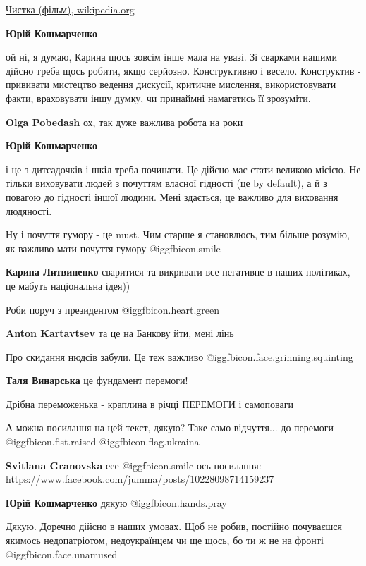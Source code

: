 \begin{itemize}
\begin{itemize}
\href{https://uk.wikipedia.org/wiki/%D0%A7%D0%B8%D1%81%D1%82%D0%BA%D0%B0_(%D1%84%D1%96%D0%BB%D1%8C%D0%BC)}{%
Чистка (фільм), wikipedia.org%
}

\textbf{Юрій Кошмарченко} 

ой ні, я думаю, Карина щось зовсім інше мала на увазі. Зі сварками нашими
дійсно треба щось робити, якщо серйозно. Конструктивно і весело. Конструктив -
прививати мистецтво ведення дискусії, критичне мислення, використовувати факти,
враховувати іншу думку, чи принаймні намагатись її зрозуміти.

\textbf{Olga Pobedash} ох, так
дуже важлива робота на роки

\textbf{Юрій Кошмарченко} 

і це з дитсадочків і шкіл треба починати. Це дійсно має стати великою місією.
Не тільки виховувати людей з почуттям власної гідності (це by default), а й з
повагою до гідності іншої людини. Мені здається, це важливо для виховання
людяності.

Ну і почуття гумору - це must. Чим старше я становлюсь, тим більше розумію, як
важливо мати почуття гумору  @igg{fbicon.smile} 

\textbf{Карина Литвиненко} сваритися та викривати все негативне в наших політиках, це мабуть національна ідея))

\end{itemize} %

Роби поруч з президентом  @igg{fbicon.heart.green} 

\textbf{Anton Kartavtsev} та це на Банкову йти, мені лінь

Про скидання нюдсів забули. Це теж важливо  @igg{fbicon.face.grinning.squinting} 

\textbf{Таля Винарська} це фундамент перемоги!

Дрібна переможенька - краплина в річці ПЕРЕМОГИ і самоповаги


А можна посилання на цей текст, дякую? Таке само відчуття... до перемоги
@igg{fbicon.fist.raised} @igg{fbicon.flag.ukraina}

\begin{itemize} %
\textbf{Svitlana Granovska} еее  @igg{fbicon.smile} 
ось посилання:
\url{https://www.facebook.com/jumma/posts/10228098714159237}

\textbf{Юрій Кошмарченко} дякую @igg{fbicon.hands.pray}
\end{itemize} %


Дякую. Доречно дійсно в наших умовах. Щоб не робив, постійно почуваєшся якимось
недопатріотом, недоукраїнцем чи ще щось, бо ти ж не на фронті  @igg{fbicon.face.unamused} 

\end{itemize} %
